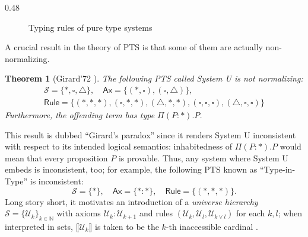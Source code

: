 \documentclass[final]{beamer}
\newtheorem*{theorem*}{Theorem}
\theoremstyle{remark}
\begin{document}
\begin{frame}[t]
\begin{columns}[t]
\begin{column}{0.48\textwidth}
\begin{figure}[ht]
        \caption{Typing rules of pure type systems}
        \label{typing}
    \end{figure}

    A crucial result in the theory of PTS is that some
    of them are actually non-normalizing.

    \begin{theorem*}[Girard'72
        \cite{hurkens1995simplification}]
        The following PTS called System U is not
        normalizing:
        \[\begin{array}{c}
            \mathcal{S}=\{*,\square,\triangle\},
            \quad\mathsf{Ax}=\{
                (*,\square),(\square,\triangle)
            \},\\
            \mathsf{Rule}=\{
                (*,*,*),(\square,*,*),(\triangle,*,*),
                (\square,\square,\square),
                (\triangle,\square,\square)
            \}
        \end{array}\]
        Furthermore, the offending term has type
        $\Pi(P:*).P$.
    \end{theorem*}

    This result is dubbed ``Girard's paradox'' since it
    renders System U inconsistent with respect to its
    intended logical semantics: inhabitedness of
    $\Pi(P:*).P$ would mean that every proposition $P$
    is provable. Thus, any system where System U embeds
    is inconsistent, too; for example, the following
    PTS known as ``Type-in-Type'' is inconsistent:
    \[\mathcal{S}=\{*\},\quad\mathsf{Ax}=\{*:*\},\quad
    \mathsf{Rule}=\{(*,*,*)\}.\]
    Long story short, it motivates an introduction of a
    \textit{universe hierarchy} $\mathcal{S}=\{
        \mathcal{U}_k\}_{k\in\mathbb{N}}$ with axioms
    $\mathcal{U}_k:\mathcal{U}_{k+1}$ and rules
    $(\mathcal{U}_k,\mathcal{U}_l,\mathcal{U}_{k\vee l}
    )$ for each $k,l$; when interpreted in sets,
    $\llbracket \mathcal{U}_k \rrbracket$ is taken to be
    the $k$-th inaccessible cardinal
    \cite{werner1997sets}.


\end{column}
\end{columns}
\end{frame}
\end{document}

